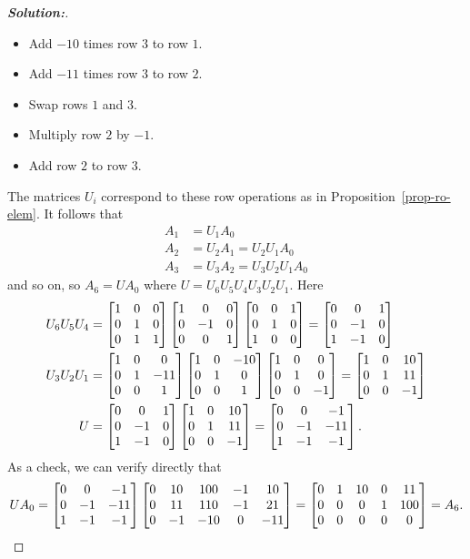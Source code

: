 \documentclass[a4paper]{amsart}
\theoremstyle{definition}
\newenvironment{solution}{\begin{proof}[\textbf{Solution:}] \vphantom{u}}{\end{proof}}
\begin{document}
\begin{solution}
\begin{itemize}
  \item[(2)] Add $-10$ times row $3$ to row $1$.
  \item[(3)] Add $-11$ times row $3$ to row $2$.
  \item[(4)] Swap rows $1$ and $3$.
  \item[(5)] Multiply row $2$ by $-1$.
  \item[(6)] Add row $2$ to row $3$.
 \end{itemize}
 The matrices $U_i$ correspond to these row operations as in
 Proposition~\ref{prop-ro-elem}.  It follows that
 \begin{align*}
  A_1 &= U_1A_0 \\
  A_2 &= U_2A_1 = U_2U_1A_0 \\
  A_3 &= U_3A_2 = U_3U_2U_1A_0
 \end{align*}
 and so on, so $A_6=UA_0$ where $U=U_6U_5U_4U_3U_2U_1$.
 Here 
 \begin{align*}
  U_6U_5U_4 &= \left[\begin{matrix} 1&0&0 \\ 0&1&0 \\ 0&1&1 \end{matrix}\right]
               \left[\begin{matrix} 1&0&0 \\ 0&-1&0 \\ 0&0&1 \end{matrix}\right]
               \left[\begin{matrix} 0&0&1 \\ 0&1&0 \\ 1&0&0 \end{matrix}\right]
             = \left[\begin{matrix} 0&0&1 \\ 0&-1&0 \\1&-1&0 \end{matrix}\right] \\
  U_3U_2U_1 &= \left[\begin{matrix} 1&0&0 \\ 0&1&-11 \\ 0&0&1 \end{matrix}\right]
               \left[\begin{matrix} 1&0&-10 \\ 0&1&0 \\ 0&0&1 \end{matrix}\right]
               \left[\begin{matrix} 1&0&0 \\ 0&1&0 \\ 0&0&-1 \end{matrix}\right]
             = \left[\begin{matrix} 1&0&10 \\ 0&1&11 \\ 0&0&-1 \end{matrix}\right] \\
  U         &= \left[\begin{matrix} 0&0&1 \\ 0&-1&0 \\1&-1&0 \end{matrix}\right]
               \left[\begin{matrix} 1&0&10 \\ 0&1&11 \\ 0&0&-1 \end{matrix}\right] 
             = \left[\begin{matrix} 0&0&-1 \\ 0&-1&-11 \\ 1&-1&-1 \end{matrix}\right].
 \end{align*}
 As a check, we can verify directly that
 \[ UA_0 = 
    \left[\begin{matrix} 0&0&-1 \\ 0&-1&-11 \\ 1&-1&-1 \end{matrix}\right]
    \left[\begin{matrix} 0 & 10 & 100 & -1 &  10 \\
         0 & 11 & 110 & -1 &  21 \\
         0 & -1 & -10 &  0 & -11
    \end{matrix}\right] = 
    \left[\begin{matrix} 0 &  1 &  10 &  0 &   11 \\
         0 &  0 &   0 &  1 &  100 \\
         0 &  0 &   0 &  0 &    0
    \end{matrix}\right] =
    A_6.
 \]
\end{solution}
\end{document}
